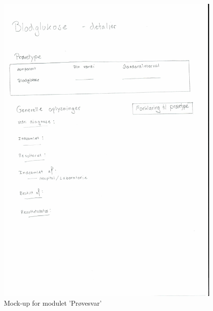    \begin{figure}[H]
 	\centering
 	\includegraphics[angle=0, height=0.7\textheight]{Materials/provesvar.pdf}
 	\caption{Mock-up for modulet 'Prøvesvar'}
 	\label{fig:Mock-Up}
 \end{figure}

